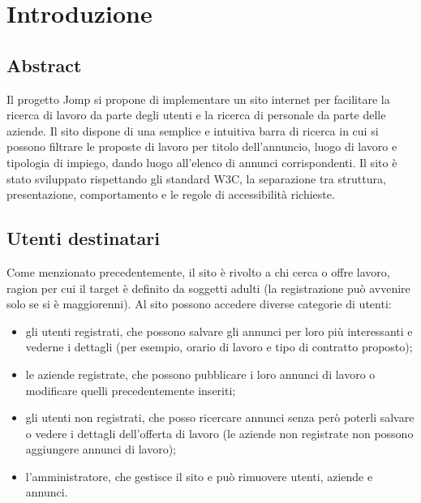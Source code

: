 \section{Introduzione}
	\subsection{Abstract}
	Il progetto Jomp si propone di implementare un sito internet per facilitare la ricerca di lavoro da parte degli utenti e la ricerca di personale da parte delle aziende. Il sito dispone di una semplice e intuitiva barra di ricerca in cui si possono filtrare le proposte di lavoro per titolo dell'annuncio, luogo di lavoro e tipologia di impiego, dando luogo all'elenco di annunci corrispondenti.
	Il sito è stato sviluppato rispettando gli standard W3C, la separazione tra struttura, presentazione, comportamento e le regole di accessibilità richieste. 
	\subsection{Utenti destinatari}
	Come menzionato precedentemente, il sito è rivolto a chi cerca o offre lavoro, ragion per cui il target è definito da soggetti adulti (la registrazione può avvenire solo se si è maggiorenni).
	Al sito possono accedere diverse categorie di utenti: 
	\begin{itemize}
	\item gli utenti registrati, che possono salvare gli annunci per loro più interessanti e vederne i dettagli (per esempio, orario di lavoro e tipo di contratto proposto); 
	\item le aziende registrate, che possono pubblicare i loro annunci di lavoro o modificare quelli precedentemente inseriti;
	\item gli utenti non registrati, che posso ricercare annunci senza però poterli salvare o vedere i dettagli dell'offerta di lavoro (le aziende non registrate non possono aggiungere annunci di lavoro); 
	\item l'amministratore, che gestisce il sito e può rimuovere utenti, aziende e annunci.
	\end{itemize}
